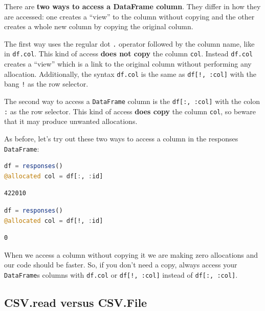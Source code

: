 \documentclass[
  notoc %
]{tufte-book}
\newcommand{\passthrough}[1]{#1}
\begin{document}
There are \textbf{two ways to access a DataFrame column}. They differ in
how they are accessed: one creates a ``view'' to the column without
copying and the other creates a whole new column by copying the original
column.

The first way uses the regular dot \passthrough{\lstinline!.!} operator
followed by the column name, like in \passthrough{\lstinline!df.col!}.
This kind of access \textbf{does not copy} the column
\passthrough{\lstinline!col!}. Instead \passthrough{\lstinline!df.col!}
creates a ``view'' which is a link to the original column without
performing any allocation. Additionally, the syntax
\passthrough{\lstinline!df.col!} is the same as
\passthrough{\lstinline"df[!, :col]"} with the bang
\passthrough{\lstinline"!"} as the row selector.

The second way to access a \passthrough{\lstinline!DataFrame!} column is
the \passthrough{\lstinline!df[:, :col]!} with the colon
\passthrough{\lstinline!:!} as the row selector. This kind of access
\textbf{does copy} the column \passthrough{\lstinline!col!}, so beware
that it may produce unwanted allocations.

As before, let's try out these two ways to access a column in the
responses \passthrough{\lstinline!DataFrame!}:

\begin{lstlisting}[language=Julia]
df = responses()
@allocated col = df[:, :id]
\end{lstlisting}

\begin{lstlisting}
422010
\end{lstlisting}

\begin{lstlisting}[language=Julia]
df = responses()
@allocated col = df[!, :id]
\end{lstlisting}

\begin{lstlisting}
0
\end{lstlisting}

When we access a column without copying it we are making zero
allocations and our code should be faster. So, if you don't need a copy,
always access your \passthrough{\lstinline!DataFrame!}s columns with
\passthrough{\lstinline!df.col!} or
\passthrough{\lstinline"df[!, :col]"} instead of
\passthrough{\lstinline!df[:, :col]!}.

\hypertarget{sec:df_performance_csv_read_file}{%
\subsection{CSV.read versus
CSV.File}\label{sec:df_performance_csv_read_file}}
\end{document}
